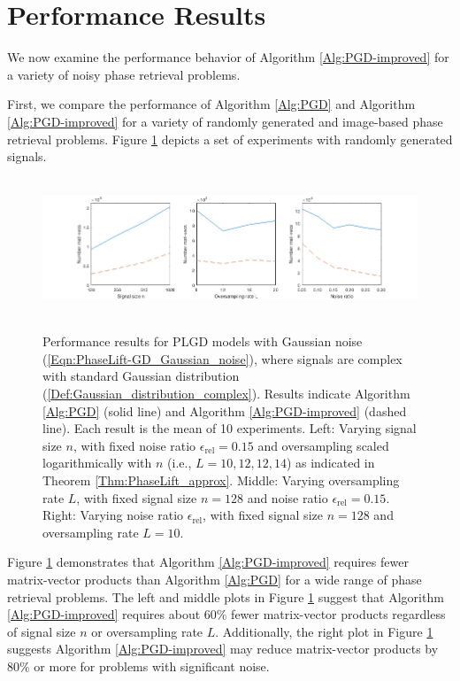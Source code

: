 \section{Performance Results} 		\label{Subsec:Numerics-perf_results}


We now examine the performance behavior of Algorithm \ref{Alg:PGD-improved} for a variety of noisy phase retrieval problems.

First, we compare the performance of Algorithm \ref{Alg:PGD} and Algorithm \ref{Alg:PGD-improved} for a variety of randomly generated and image-based phase retrieval problems.
Figure \ref{Fig:Numerics-ada_vs_orig_various_params} depicts a set of experiments with randomly generated signals.


\begin{figure}[H]
\centering
\hbox{\hspace{-1.1cm} 
	\includegraphics[scale=0.6]{Numerics-ada_vs_orig_various_params}
			}
	\vspace{0.0cm}
	\caption{
	Performance results for PLGD models with Gaussian noise (\ref{Eqn:PhaseLift-GD_Gaussian_noise}), where signals are complex with standard Gaussian distribution (\ref{Def:Gaussian_distribution_complex}).
	Results indicate Algorithm \ref{Alg:PGD} (solid line) and Algorithm \ref{Alg:PGD-improved} (dashed line). 
	Each result is the mean of 10 experiments.
	Left: Varying signal size $n$, with fixed noise ratio $\epsilon_\text{rel} = 0.15$ and oversampling scaled logarithmically with $n$ (i.e., $L = 10, 12, 12, 14$) as indicated in Theorem \ref{Thm:PhaseLift_approx}.
	Middle: Varying oversampling rate $L$, with fixed signal size $n = 128$ and noise ratio $\epsilon_\text{rel} = 0.15$.
	Right: Varying noise ratio $\epsilon_\text{rel}$, with fixed signal size $n = 128$ and oversampling rate $L = 10$.
	}
\label{Fig:Numerics-ada_vs_orig_various_params}
\end{figure}

Figure \ref{Fig:Numerics-ada_vs_orig_various_params} demonstrates that Algorithm \ref{Alg:PGD-improved} requires fewer matrix-vector products than Algorithm \ref{Alg:PGD} for a wide range of phase retrieval problems.
The left and middle plots in Figure \ref{Fig:Numerics-ada_vs_orig_various_params} suggest that Algorithm \ref{Alg:PGD-improved} requires about $60\%$ fewer matrix-vector products regardless of signal size $n$ or oversampling rate $L$.
Additionally, the right plot in Figure \ref{Fig:Numerics-ada_vs_orig_various_params} suggests Algorithm \ref{Alg:PGD-improved} may reduce matrix-vector products by $80\%$ or more for problems with significant noise.



